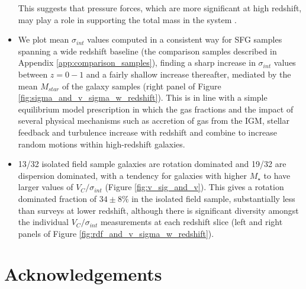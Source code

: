 \documentclass[fleqn,usenatbib]{mn2e}
\begin{document}
\begin{itemize}
    This suggests that pressure forces, which are more significant at high redshift, may play a role in supporting the total mass in the system \citep[e.g.][]{Burkert2010}.  
    \item We plot mean $\sigma_{int}$ values computed in a consistent way for SFG samples spanning a wide redshift baseline (the comparison samples described in Appendix \ref{app:comparison_samples}), finding a sharp increase in $\sigma_{int}$ values between $z=0-1$ and a fairly shallow increase thereafter, mediated by the mean $M_{star}$ of the galaxy samples (right panel of Figure \ref{fig:sigma_and_v_sigma_w_redshift}).
    This is in line with a simple equilibrium model prescription in which the gas fractions and the impact of several physical mechanisms such as accretion of gas from the IGM, stellar feedback and turbulence increase with redshift and combine to increase random motions within high-redshift galaxies.
    \item 13/32 isolated field sample galaxies are rotation dominated and 19/32 are dispersion dominated, with a tendency for galaxies with higher $M_{\star}$ to have larger values of $V_{C}/\sigma_{int}$ (Figure \ref{fig:v_sig_and_v}).
    This gives a rotation dominated fraction of $34 \pm 8 \%$ in the isolated field sample, substantially less than surveys at lower redshift, although there is significant diversity amongst the individual $V_{C}/\sigma_{int}$ measurements at each redshift slice (left and right panels of Figure \ref{fig:rdf_and_v_sigma_w_redshift}).

\end{itemize}

\section*{Acknowledgements}
\end{document}
